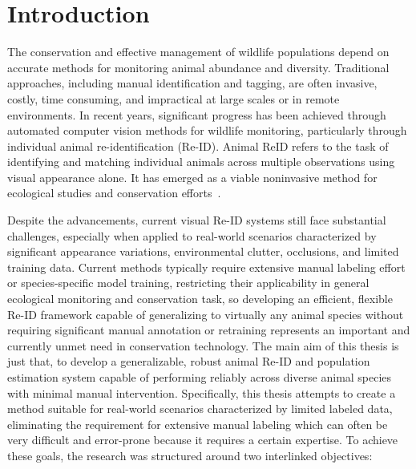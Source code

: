 \chapter{Introduction}
\label{chap:introduction}
The conservation and effective management of wildlife populations depend on accurate methods for monitoring animal abundance and diversity. 
Traditional approaches, including manual identification and tagging, are often invasive, costly, time consuming, and impractical at large scales or
 in remote environments. In recent years, significant progress has been achieved through automated computer vision methods for wildlife monitoring, 
particularly through individual animal re-identification (Re-ID). Animal ReID refers to the task of identifying and matching individual animals across 
multiple observations using visual appearance alone. It has emerged as a viable noninvasive method for ecological studies and conservation efforts~\cite{re-id-overview}.


Despite the advancements, current visual Re-ID systems still face substantial challenges, especially when applied to real-world scenarios characterized by significant appearance variations, environmental clutter, occlusions, and limited training data. Current methods typically require extensive manual labeling effort or species-specific model training, restricting their applicability in general ecological monitoring and conservation task, so developing an efficient, flexible Re-ID framework capable of generalizing to virtually any animal species without requiring significant manual annotation or retraining represents an important and currently unmet need in conservation technology. The main aim of this thesis is just that, to develop a generalizable, robust animal Re-ID and population estimation system capable of performing reliably across diverse animal species with minimal manual intervention. Specifically, this thesis attempts to create a method suitable for real-world scenarios characterized by limited labeled data, eliminating the requirement for extensive manual labeling which can often be very difficult and error-prone because it requires a certain expertise. To achieve these goals, the research was structured around two interlinked objectives:

